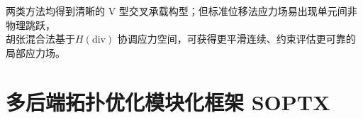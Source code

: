\documentclass[notheorems]{beamer}
\begin{document}
\begin{frame}
{			\vspace{0.35em}
			
			\begin{tcolorbox}[
				colback=structure.fg,
				colframe=structure.fg,
				coltext=white,
				boxrule=0pt,
				arc=3pt,
				top=3pt,
				bottom=3pt,
				left=8pt,
				right=8pt]
				\centering
				{\fontsize{7.35}{9.8}\selectfont\sffamily
					两类方法均得到清晰的 V 型交叉承载构型；但标准位移法应力场易出现单元间非物理跳跃，\\
					胡张混合法基于$H(\text{div})$ 协调应力空间，可获得更平滑连续、约束评估更可靠的局部应力场。}
			\end{tcolorbox}
		}
		
	\end{frame}
	
	
	\section{多后端拓扑优化模块化框架 SOPTX}
	
\end{document}
